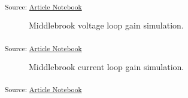 \documentclass[
  a4paper,
  DIV=11,
  numbers=noendperiod]{scrartcl}
\begin{document}
\textsubscript{Source:
\href{https://iic-jku.github.io/analog-circuit-design/index.qmd.html}{Article
Notebook}}

\begin{figure}[H]


\caption{\label{fig-middlebrook-voltage}Middlebrook voltage loop gain
simulation.}

\end{figure}%

\textsubscript{Source:
\href{https://iic-jku.github.io/analog-circuit-design/index.qmd.html}{Article
Notebook}}

\begin{figure}[H]


\caption{\label{fig-middlebrook-current}Middlebrook current loop gain
simulation.}

\end{figure}%

\textsubscript{Source:
\href{https://iic-jku.github.io/analog-circuit-design/index.qmd.html}{Article
Notebook}}
\end{document}
